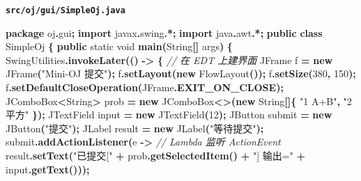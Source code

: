 \documentclass[
  11pt,
]{ctexart}
\newenvironment{Shaded}{\begin{snugshade}}{\end{snugshade}}
\newcommand{\BuiltInTok}[1]{#1}
\newcommand{\CommentTok}[1]{\textcolor[rgb]{0.56,0.35,0.01}{\textit{#1}}}
\newcommand{\DataTypeTok}[1]{\textcolor[rgb]{0.13,0.29,0.53}{#1}}
\newcommand{\DecValTok}[1]{\textcolor[rgb]{0.00,0.00,0.81}{#1}}
\newcommand{\FunctionTok}[1]{\textcolor[rgb]{0.13,0.29,0.53}{\textbf{#1}}}
\newcommand{\ImportTok}[1]{#1}
\newcommand{\KeywordTok}[1]{\textcolor[rgb]{0.13,0.29,0.53}{\textbf{#1}}}
\newcommand{\NormalTok}[1]{#1}
\newcommand{\OperatorTok}[1]{\textcolor[rgb]{0.81,0.36,0.00}{\textbf{#1}}}
\newcommand{\StringTok}[1]{\textcolor[rgb]{0.31,0.60,0.02}{#1}}
\begin{document}
\textbf{\texttt{src/oj/gui/SimpleOj.java}}

\begin{Shaded}
\begin{Highlighting}[]
\KeywordTok{package}\ImportTok{ oj}\OperatorTok{.}\ImportTok{gui}\OperatorTok{;}
\KeywordTok{import} \ImportTok{javax}\OperatorTok{.}\ImportTok{swing}\OperatorTok{.*;}
\KeywordTok{import} \ImportTok{java}\OperatorTok{.}\ImportTok{awt}\OperatorTok{.*;}
\KeywordTok{public} \KeywordTok{class}\NormalTok{ SimpleOj }\OperatorTok{\{}
    \KeywordTok{public} \DataTypeTok{static} \DataTypeTok{void} \FunctionTok{main}\OperatorTok{(}\BuiltInTok{String}\OperatorTok{[]}\NormalTok{ args}\OperatorTok{)} \OperatorTok{\{}
        \BuiltInTok{SwingUtilities}\OperatorTok{.}\FunctionTok{invokeLater}\OperatorTok{(()} \OperatorTok{{-}\textgreater{}} \OperatorTok{\{}               \CommentTok{// 在 EDT 上建界面}
            \BuiltInTok{JFrame}\NormalTok{ f }\OperatorTok{=} \KeywordTok{new} \BuiltInTok{JFrame}\OperatorTok{(}\StringTok{"Mini{-}OJ 提交"}\OperatorTok{);}
\NormalTok{            f}\OperatorTok{.}\FunctionTok{setLayout}\OperatorTok{(}\KeywordTok{new} \BuiltInTok{FlowLayout}\OperatorTok{());}
\NormalTok{            f}\OperatorTok{.}\FunctionTok{setSize}\OperatorTok{(}\DecValTok{380}\OperatorTok{,} \DecValTok{150}\OperatorTok{);}
\NormalTok{            f}\OperatorTok{.}\FunctionTok{setDefaultCloseOperation}\OperatorTok{(}\BuiltInTok{JFrame}\OperatorTok{.}\FunctionTok{EXIT\_ON\_CLOSE}\OperatorTok{);}
            \BuiltInTok{JComboBox}\OperatorTok{\textless{}}\BuiltInTok{String}\OperatorTok{\textgreater{}}\NormalTok{ prob }\OperatorTok{=} \KeywordTok{new} \BuiltInTok{JComboBox}\OperatorTok{\textless{}\textgreater{}(}\KeywordTok{new} \BuiltInTok{String}\OperatorTok{[]\{} \StringTok{"1 A+B"}\OperatorTok{,} \StringTok{"2 平方"} \OperatorTok{\});}
            \BuiltInTok{JTextField}\NormalTok{ input }\OperatorTok{=} \KeywordTok{new} \BuiltInTok{JTextField}\OperatorTok{(}\DecValTok{12}\OperatorTok{);}
            \BuiltInTok{JButton}\NormalTok{ submit }\OperatorTok{=} \KeywordTok{new} \BuiltInTok{JButton}\OperatorTok{(}\StringTok{"提交"}\OperatorTok{);}
            \BuiltInTok{JLabel}\NormalTok{ result }\OperatorTok{=} \KeywordTok{new} \BuiltInTok{JLabel}\OperatorTok{(}\StringTok{"等待提交"}\OperatorTok{);}
\NormalTok{            submit}\OperatorTok{.}\FunctionTok{addActionListener}\OperatorTok{(}\NormalTok{e }\OperatorTok{{-}\textgreater{}}                \CommentTok{// Lambda 监听 ActionEvent}
\NormalTok{                result}\OperatorTok{.}\FunctionTok{setText}\OperatorTok{(}\StringTok{"已提交["} \OperatorTok{+}\NormalTok{ prob}\OperatorTok{.}\FunctionTok{getSelectedItem}\OperatorTok{()} \OperatorTok{+} \StringTok{"] 输出="} \OperatorTok{+}\NormalTok{ input}\OperatorTok{.}\FunctionTok{getText}\OperatorTok{()));}

\end{Highlighting}
\end{Shaded}
\end{document}
